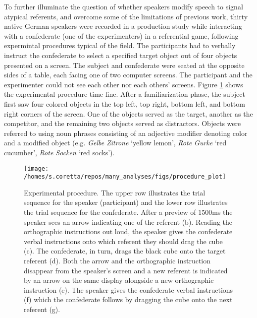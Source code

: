 \documentclass[Review,times,sageh]{sagej}
\begin{document}
To further illuminate the question of whether speakers modify speech to
signal atypical referents, and overcome some of the limitations of
previous work, thirty native German speakers were recorded in a
production study while interacting with a confederate (one of the
experimenters) in a referential game, following expermintal procedures
typical of the field. The participants had to verbally instruct the
confederate to select a specified target object out of four objects
presented on a screen. The subject and confederate were seated at the
opposite sides of a table, each facing one of two computer screens. The
participant and the experimenter could not see each other nor each
others' screens. Figure \ref{fig:procedural} shows the experimental
procedure time-line. After a familiarization phase, the subject first
saw four colored objects in the top left, top right, bottom left, and
bottom right corners of the screen. One of the objects served as the
target, another as the competitor, and the remaining two objects served
as distractors. Objects were referred to using noun phrases consisting
of an adjective modifier denoting color and a modified object (e.g.
\emph{Gelbe Zitrone} `yellow lemon', \emph{Rote Gurke} `red cucumber',
\emph{Rote Socken} `red socks').














\begin{figure}
\texttt{[image: /homes/s.coretta/repos/many\_analyses/figs/procedure\_plot]} \caption{Experimental procedure. The upper row illustrates the
trial sequence for the speaker (participant) and the lower row
illustrates the trial sequence for the confederate. After a preview of
1500ms the speaker sees an arrow indicating one of the referent (b).
Reading the orthographic instructions out loud, the speaker gives the
confederate verbal instructions onto which referent they should drag the
cube (c). The confederate, in turn, drags the black cube onto the target
referent (d). Both the arrow and the orthographic instruction disappear
from the speaker's screen and a new referent is indicated by an arrow on
the same display alongside a new orthographic instruction (e). The
speaker gives the confederate verbal instructions (f) which the
confederate follows by dragging the cube onto the next referent (g).}\label{fig:procedural}
\end{figure}
\end{document}

